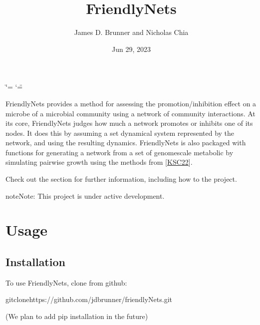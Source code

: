 \documentclass[letterpaper,10pt,english]{sphinxmanual}
\title{FriendlyNets}
\date{Jun 29, 2023}
\author{James D.\@{} Brunner and Nicholas Chia}
\begin{document}
\ifdefined\shorthandoff
  \ifnum\catcode`\=\string=\active\shorthandoff{=}\fi
  \ifnum\catcode`\"=\active{}\fi
\fi

\pagestyle{empty}
\sphinxmaketitle
\pagestyle{plain}
\sphinxtableofcontents
\pagestyle{normal}
\label{\detokenize{index::doc}}


\sphinxAtStartPar
FriendlyNets provides a method for assessing the promotion/inhibition effect on a microbe of a microbial community using a network of community interactions. At its core, FriendlyNets judges how much a network
promotes or inhibits one of its nodes. It does this by assuming a set dynamical system represented by the network, and using the resulting dynamics. FriendlyNets is also packaged with functions for generating
a network from a set of genome\sphinxhyphen{}scale metabolic by simulating pairwise growth using the methods from {[}\hyperlink{cite.index:id3}{KSC22}{]}.

\sphinxAtStartPar
Check out the {\hyperref[\detokenize{usage::doc}]{}} section for further information, including how to
{\hyperref[\detokenize{usage:installation}]{}} the project.

\begin{sphinxadmonition}{note}{Note:}
\sphinxAtStartPar
This project is under active development.
\end{sphinxadmonition}

\sphinxstepscope


\chapter{Usage}
\label{\detokenize{usage:usage}}\label{\detokenize{usage::doc}}

\section{Installation}
\label{\detokenize{usage:installation}}\label{\detokenize{usage:id1}}
\sphinxAtStartPar
To use FriendlyNets, clone from github:

\begin{sphinxVerbatim}[commandchars=\\\{\}]
gitclonehttps://github.com/jdbrunner/friendlyNets.git
\end{sphinxVerbatim}

\sphinxAtStartPar
(We plan to add pip installation in the future)
\end{document}
